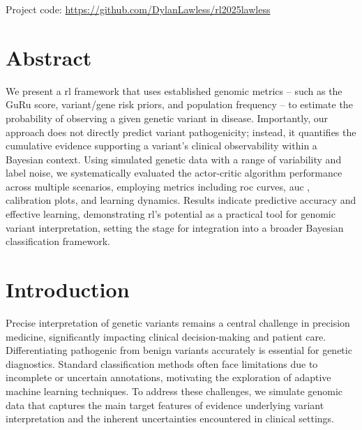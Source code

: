 \vfill
\noindent Project code: \href{https://github.com/DylanLawless/rl2025lawless}{https://github.com/DylanLawless/rl2025lawless}

\clearpage

\section*{Abstract}

We present a \ac{rl} framework that uses established genomic metrics -- such as the GuRu score, variant/gene risk priors, and population frequency -- to estimate the probability of observing a given genetic variant in disease. Importantly, our approach does not directly predict variant pathogenicity; instead, it quantifies the cumulative evidence supporting a variant’s clinical observability within a Bayesian context. Using simulated genetic data with a range of variability and label noise, we systematically evaluated the actor-critic algorithm performance across multiple scenarios, employing metrics including \ac{roc} curves, \ac{auc} , calibration plots, and learning dynamics. Results indicate predictive accuracy and effective learning, demonstrating \ac{rl}’s potential as a practical tool for genomic variant interpretation, setting the stage for integration into a broader Bayesian classification framework.

\section{Introduction}
Precise interpretation of genetic variants remains a central challenge in precision medicine, significantly impacting clinical decision-making and patient care. Differentiating pathogenic from benign variants accurately is essential for genetic diagnostics. Standard classification methods often face limitations due to incomplete or uncertain annotations, motivating the exploration of adaptive machine learning techniques.
To address these challenges, we simulate genomic data that captures the main target features of evidence underlying variant interpretation and the inherent uncertainties encountered in clinical settings.

